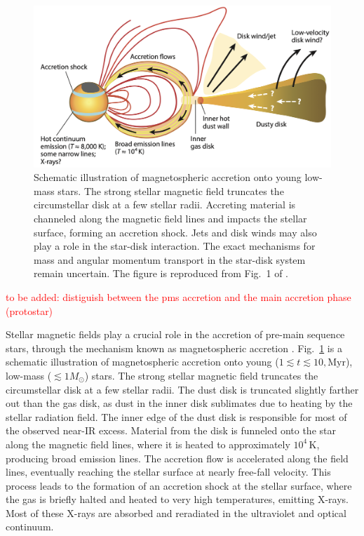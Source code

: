 \documentclass[12pt,a4paper]{article}
\newcommand{\mr}{\mathrm}
\newcommand{\qt}[1]{\textcolor{red}{#1}}
\begin{document}
\begin{figure}
  \centering
  \includegraphics[width=.8\textwidth]{HartmannEtAl2016_magnetospheric_accretion.png}
  \caption{Schematic illustration of magnetospheric accretion onto young low-mass stars. The strong stellar magnetic field truncates the circumstellar disk at a few stellar radii. Accreting material is channeled along the magnetic field lines and impacts the stellar surface, forming an accretion shock. Jets and disk winds may also play a role in the star-disk interaction. The exact mechanisms for mass and angular momentum transport in the star-disk system remain uncertain. The figure is reproduced from Fig.~1 of \textcite{HartmannEtAl2016}.}
  \label{fig:magnetospheric_accretion}
\end{figure}

\qt{to be added: distiguish between the pms accretion and the main accretion phase (protostar)}\par

Stellar magnetic fields play a crucial role in the accretion of pre-main sequence stars, through the mechanism known as magnetospheric accretion \parencite[See, for example,][for a review]{HartmannEtAl2016}. Fig.~\ref{fig:magnetospheric_accretion} is a schematic illustration of magnetospheric accretion onto young ($1 \lesssim t \lesssim 10,\mr{Myr}$), low-mass ($\lesssim 1 M_\odot$) stars. The strong stellar magnetic field truncates the circumstellar disk at a few stellar radii. The dust disk is truncated slightly farther out than the gas disk, as dust in the inner disk sublimates due to heating by the stellar radiation field. The inner edge of the dust disk is responsible for most of the observed near-IR excess. Material from the disk is funneled onto the star along the magnetic field lines, where it is heated to approximately $10^4\,\mr{K}$, producing broad emission lines. The accretion flow is accelerated along the field lines, eventually reaching the stellar surface at nearly free-fall velocity. This process leads to the formation of an accretion shock at the stellar surface, where the gas is briefly halted and heated to very high temperatures, emitting X-rays. Most of these X-rays are absorbed and reradiated in the ultraviolet and optical continuum.
\end{document}
